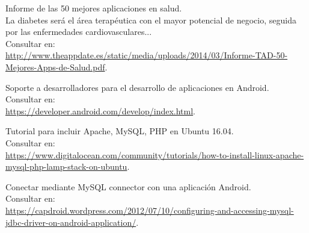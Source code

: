 \documentclass[11pt,spanish,
		listoftables,listoffigures]
		{tfgplantilla}
\begin{document}
\begin{thebibliography}{10}




   Informe de las 50 mejores aplicaciones en salud.\\
   \guillemotleft La diabetes será el área terapéutica con el mayor potencial de negocio, seguida por las enfermedades cardiovasculares... \guillemotright\\
   \newblock Consultar en:\\
   \url{ http://www.theappdate.es/static/media/uploads/2014/03/Informe-TAD-50-Mejores-Apps-de-Salud.pdf}.

   Soporte a desarrolladores para el desarrollo de aplicaciones en Android.\\
   \newblock Consultar en:\\
   \url{https://developer.android.com/develop/index.html}.

   Tutorial para incluir Apache, MySQL, PHP en Ubuntu 16.04.\\
   \newblock Consultar en:\\
   \url{https://www.digitalocean.com/community/tutorials/how-to-install-linux-apache-mysql-php-lamp-stack-on-ubuntu}.

   Conectar mediante MySQL connector con una aplicación Android.\\
   \newblock Consultar en:\\
   \url{ https://capdroid.wordpress.com/2012/07/10/configuring-and-accessing-mysql-jdbc-driver-on-android-application/}.


\end{thebibliography}
\end{document}
